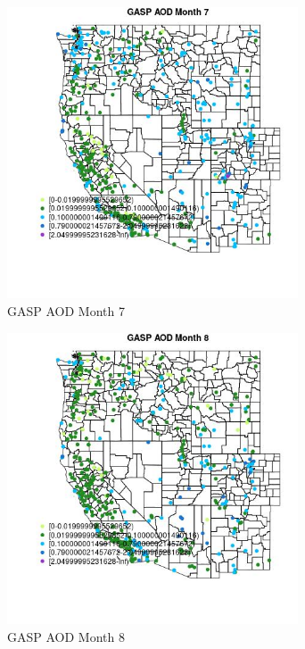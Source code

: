 \begin{figure} 
\centering  
\includegraphics[width=0.77\textwidth]{Code_Outputs/Report_ML_input_PM25_Step4_part_e_de_duplicated_aves_compiled_2019-05-14wNAs_MapObsMo7GASP_AOD.jpg} 
\caption{\label{fig:Report_ML_input_PM25_Step4_part_e_de_duplicated_aves_compiled_2019-05-14wNAsMapObsMo7GASP_AOD}GASP AOD Month 7} 
\end{figure} 
 

\begin{figure} 
\centering  
\includegraphics[width=0.77\textwidth]{Code_Outputs/Report_ML_input_PM25_Step4_part_e_de_duplicated_aves_compiled_2019-05-14wNAs_MapObsMo8GASP_AOD.jpg} 
\caption{\label{fig:Report_ML_input_PM25_Step4_part_e_de_duplicated_aves_compiled_2019-05-14wNAsMapObsMo8GASP_AOD}GASP AOD Month 8} 
\end{figure} 
 

